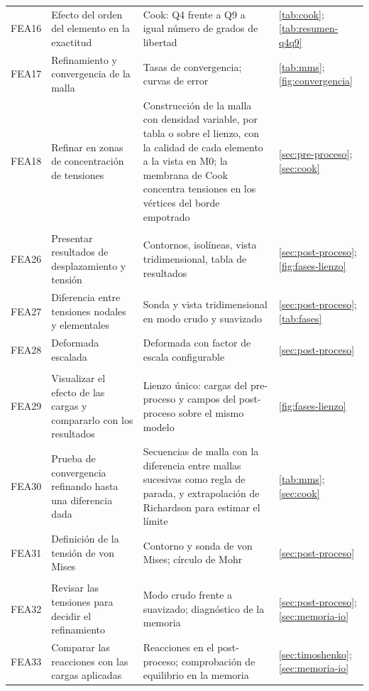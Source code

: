 {\begin{longtable}{@{}>{\raggedright\arraybackslash}p{1.3cm}>{\raggedright\arraybackslash}p{5.3cm}>{\raggedright\arraybackslash}p{5.2cm}>{\raggedright\arraybackslash}p{2.6cm}@{}}
FEA16 & Efecto del orden del elemento en la exactitud & Cook: Q4 frente a Q9 a igual número de grados de libertad & \autoref{tab:cook}; \autoref{tab:resumen-q4q9} \\
FEA17 & Refinamiento y convergencia de la malla & Tasas de convergencia; curvas de error & \autoref{tab:mms}; \autoref{fig:convergencia} \\
FEA18 & Refinar en zonas de concentración de tensiones & Construcción de la malla con densidad variable, por tabla o sobre el lienzo, con la calidad de cada elemento a la vista en M0; la membrana de Cook concentra tensiones en los vértices del borde empotrado & \autoref{sec:pre-proceso}; \autoref{sec:cook} \\
\multicolumn{4}{@{}l}{\emph{Post-proceso}} \\
FEA26 & Presentar resultados de desplazamiento y tensión & Contornos, isolíneas, vista tridimensional, tabla de resultados & \autoref{sec:post-proceso}; \autoref{fig:fases-lienzo} \\
FEA27 & Diferencia entre tensiones nodales y elementales & Sonda y vista tridimensional en modo crudo y suavizado & \autoref{sec:post-proceso}; \autoref{tab:fases} \\
FEA28 & Deformada escalada & Deformada con factor de escala configurable & \autoref{sec:post-proceso} \\
\multicolumn{4}{@{}l}{\emph{Conceptos fundamentales}} \\
FEA29 & Visualizar el efecto de las cargas y compararlo con los resultados & Lienzo único: cargas del pre-proceso y campos del post-proceso sobre el mismo modelo & \autoref{fig:fases-lienzo} \\
FEA30 & Prueba de convergencia refinando hasta una diferencia dada & Secuencias de malla con la diferencia entre mallas sucesivas como regla de parada, y extrapolación de Richardson para estimar el límite & \autoref{tab:mms}; \autoref{sec:cook} \\
FEA31 & Definición de la tensión de von Mises & Contorno y sonda de von Mises; círculo de Mohr & \autoref{sec:post-proceso} \\
\multicolumn{4}{@{}l}{\emph{Verificación y validación}} \\
FEA32 & Revisar las tensiones para decidir el refinamiento & Modo crudo frente a suavizado; diagnóstico de la memoria & \autoref{sec:post-proceso}; \autoref{sec:memoria-io} \\
FEA33 & Comparar las reacciones con las cargas aplicadas & Reacciones en el post-proceso; comprobación de equilibrio en la memoria & \autoref{sec:timoshenko}; \autoref{sec:memoria-io} \\

\end{longtable}}
